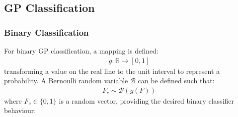 \documentclass{article}
\numberwithin{equation}{section}
\begin{document}
\subsection{GP Classification}
\subsubsection{Binary Classification}
For binary GP classification, a mapping is defined:
\begin{align}
g: \mathbb{R} \rightarrow [0, 1]
\end{align}
transforming a value on the real line to the unit interval to represent a probability.
A Bernoulli random variable $\mathcal{B}$ can be defined such that:
\begin{align}
F_c \sim \mathcal{B}(g(F))
\end{align}
where $F_c \in \{0, 1\}$ is a random vector, providing the desired binary classifier behaviour.
\end{document}
